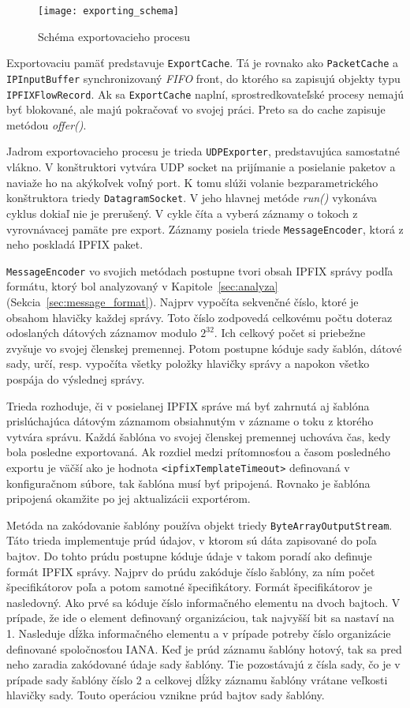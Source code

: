\begin{figure}[ht!]
\centering
\texttt{[image: exporting\_schema]}
\caption{Schéma exportovacieho procesu}\label{o:exporting_schema}
\end{figure}

Exportovaciu pamäť predstavuje \verb|ExportCache|. Tá je rovnako ako \verb|PacketCache| a 
\verb|IPInputBuffer| synchronizovaný \emph{FIFO} front, do ktorého sa zapisujú objekty typu 
\verb|IPFIXFlowRecord|. Ak sa \verb|ExportCache| naplní, sprostredkovateľské procesy nemajú byť blokované, 
ale majú pokračovať vo svojej práci. Preto sa do cache zapisuje metódou \emph{offer()}.

Jadrom exportovacieho procesu je trieda \verb|UDPExporter|, predstavujúca samostatné vlákno. V 
konštruktori vytvára UDP socket na prijímanie a posielanie paketov a naviaže ho na akýkoľvek voľný port.
K tomu slúži volanie bezparametrického konštruktora triedy \verb|DatagramSocket|. V jeho hlavnej metóde 
\emph{run()} vykonáva cyklus dokiaľ nie je prerušený. V cykle číta a vyberá záznamy o tokoch z 
vyrovnávacej pamäte pre export. Záznamy posiela triede \verb|MessageEncoder|, ktorá z neho poskladá 
IPFIX paket.

\verb|MessageEncoder| vo svojich metódach postupne tvori obsah IPFIX správy podľa formátu, ktorý bol 
analyzovaný v Kapitole~\ref{sec:analyza} (Sekcia~\ref{sec:message_format}). Najprv vypočíta 
sekvenčné číslo, ktoré je obsahom hlavičky každej správy. Toto číslo zodpovedá celkovému počtu doteraz 
odoslaných dátových záznamov modulo $2^{32}$. Ich celkový počet si priebežne zvyšuje vo svojej členskej 
premennej. Potom postupne kóduje sady šablón, dátové sady, určí, resp. vypočíta všetky položky 
hlavičky správy a napokon všetko pospája do výslednej správy.

Trieda rozhoduje, či v posielanej IPFIX správe má byť zahrnutá aj šablóna prislúchajúca dátovým záznamom
obsiahnutým v zázname o toku z ktorého vytvára správu. Každá šablóna vo svojej členskej premennej uchováva
čas, kedy bola posledne exportovaná. Ak rozdiel medzi prítomnosťou a časom posledného exportu je väčší ako 
je hodnota \verb|<ipfixTemplateTimeout>| definovaná v konfiguračnom súbore, tak šablóna musí byť pripojená.
Rovnako je šablóna pripojená okamžite po jej aktualizácii exportérom. 

Metóda na zakódovanie šablóny používa objekt triedy \verb|ByteArrayOutputStream|. Táto trieda 
implementuje prúd údajov, v ktorom sú dáta zapisované do poľa bajtov. Do tohto prúdu postupne kóduje údaje 
v takom poradí ako definuje formát IPFIX správy. Najprv do prúdu zakóduje číslo šablóny, za ním 
počet špecifikátorov poľa a potom samotné špecifikátory. Formát špecifikátorov je nasledovný. Ako prvé sa 
kóduje číslo informačného elementu na dvoch bajtoch. V prípade, že ide o element definovaný 
organizáciou, tak najvyšší bit sa nastaví na 1. Nasleduje dĺžka informačného elementu a v prípade potreby 
číslo organizácie definované spoločnosťou IANA. Keď je prúd záznamu šablóny hotový, tak sa pred neho 
zaradia zakódované údaje sady šablóny. Tie pozostávajú z čísla sady, čo je v prípade sady šablóny číslo 2
a celkovej dĺžky záznamu šablóny 
vrátane veľkosti hlavičky sady. Touto operáciou vznikne prúd bajtov sady šablóny.

